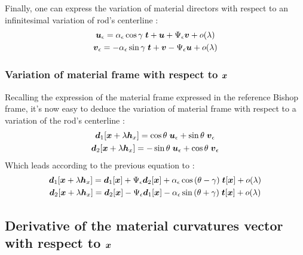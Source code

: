 Finally, one can express the variation of material directors with respect to an infinitesimal variation of rod's centerline :
\begin{subequations}
\begin{gather}
		\boldsymbol{u}_\epsilon = \alpha_\epsilon\cos{\gamma}\;\boldsymbol{t} + \boldsymbol{u} + \Psi_\epsilon\boldsymbol{v} + o(\lambda)
		\\
		\boldsymbol{v}_\epsilon = -\alpha_\epsilon\sin{\gamma}\;\boldsymbol{t} + \boldsymbol{v} - \Psi_\epsilon\boldsymbol{u} + o(\lambda)
\end{gather}
\end{subequations}

\subsubsection{Variation of material frame with respect to $\boldsymbol{x}$}
Recalling the expression of the material frame expressed in the reference Bishop frame, it's now easy to deduce the variation of material frame with respect to a variation of the rod's centerline :
\begin{subequations}
		\begin{gather}
			\boldsymbol{d}_1[\boldsymbol{x}+\lambda \boldsymbol{h}_x] =
			\cos{\theta} \; \boldsymbol{u}_\epsilon + \sin{\theta} \; \boldsymbol{v}_\epsilon\\
			\boldsymbol{d}_2[\boldsymbol{x}+\lambda \boldsymbol{h}_x] =
			-\sin{\theta} \; \boldsymbol{u}_\epsilon + \cos{\theta} \; \boldsymbol{v}_\epsilon
		\end{gather}
\end{subequations}
Which leads according to the previous equation to :
\begin{subequations}
	\begin{gather}
		\boldsymbol{d}_1[\boldsymbol{x}+\lambda \boldsymbol{h}_x] = \boldsymbol{d}_1[\boldsymbol{x}] + \Psi_\epsilon\boldsymbol{d}_2[\boldsymbol{x}] + \alpha_\epsilon\cos{(\theta-\gamma)}\;\boldsymbol{t}[\boldsymbol{x}] + o(\lambda) \\
		\boldsymbol{d}_2[\boldsymbol{x}+\lambda \boldsymbol{h}_x] = \boldsymbol{d}_2[\boldsymbol{x}] - \Psi_\epsilon\boldsymbol{d}_1[\boldsymbol{x}] - \alpha_\epsilon\sin{(\theta+\gamma)}\;\boldsymbol{t}[\boldsymbol{x}] + o(\lambda)
		\end{gather}
\end{subequations}

\subsection{Derivative of the material curvatures vector with respect to $\boldsymbol{x}$}

